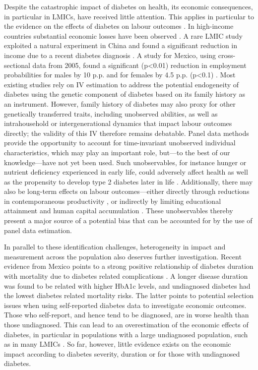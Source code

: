 \documentclass[12pt,english]{article}
\begin{document}
Despite the catastrophic impact of diabetes on health, its economic consequences, in particular in \acp{LMIC}, have received little attention. This applies in particular to the evidence on the effects of diabetes on labour outcomes \parencite{Seuring2015a}. In high-income countries substantial economic losses have been observed \parencite{Brown2005,Brown2014,BrownIII2011,Minor2011,Minor2013,Minor2015,Latif2009}. A rare \ac{LMIC} study exploited a natural experiment in China and found a significant reduction in income due to a recent diabetes diagnosis \parencite{Liu2014}. A study for Mexico, using cross-sectional data from 2005, found a significant (p<0.01) reduction in employment probabilities for males by 10 \ac{p.p.} and for females by 4.5 \ac{p.p.} (p<0.1) \parencite{Seuring2015}. Most existing studies rely on \ac{IV} estimation to address the potential endogeneity of diabetes using the genetic component of diabetes based on its family history as an instrument.  However, family history of diabetes may also proxy for other genetically transferred traits, including unobserved abilities, as well as  intrahousehold or intergenerational dynamics that impact labour outcomes directly; the validity of this \ac{IV} therefore remains debatable. Panel data methods provide the opportunity to account for time-invariant unobserved individual characteristics, which may play an important role, but---to the best of our knowledge---have not yet been used. Such unobservables, for instance hunger or nutrient deficiency experienced in early life, could adversely affect health as well as the propensity to develop type 2 diabetes later in life \parencite{VanEwijk2011,Sotomayor2013,Li2010b}. Additionally, there may also be long-term effects on labour outcomes---either directly through reductions in contemporaneous productivity \parencite{Currie2013}, or indirectly by limiting educational attainment and human capital accumulation \parencite{Ayyagari2011a}. These unobservables thereby present a major source of a potential bias that can be accounted for by the use of panel data estimation.

In parallel to these identification challenges, heterogeneity in impact and measurement across the population also deserves further investigation. Recent evidence from Mexico points to a strong positive relationship of diabetes duration with mortality due to diabetes related complications \parencite{Herrington2018}. A longer disease duration was found to be related with higher \ac{HbA1c} levels, and undiagnosed diabetes had the lowest diabetes related mortality risks. The latter points to potential selection issues when using self-reported diabetes data to investigate economic outcomes. Those who self-report, and hence tend to be diagnosed, are in worse health than those undiagnosed. This can lead to an overestimation of the economic effects of diabetes, in particular in populations with a large undiagnosed population, such as in many \acp{LMIC} \parencite{Beagley2014}. So far, however, little evidence exists on the economic impact according to diabetes severity, duration or for those with undiagnosed diabetes. 
\end{document}
